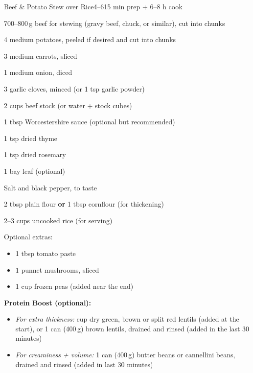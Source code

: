 \begin{recipebox}{Beef \& Potato Stew over Rice}{4--6}{15 min prep + 6--8 h cook}
  \begin{ingredients}
    \item 700--800\,g beef for stewing (gravy beef, chuck, or similar), cut into chunks
    \item 4 medium potatoes, peeled if desired and cut into chunks
    \item 3 medium carrots, sliced
    \item 1 medium onion, diced
    \item 3 garlic cloves, minced (or 1 tsp garlic powder)
    \item 2 cups beef stock (or water + stock cubes)
    \item 1 tbsp Worcestershire sauce (optional but recommended)
    \item 1 tsp dried thyme
    \item 1 tsp dried rosemary
    \item 1 bay leaf (optional)
    \item Salt and black pepper, to taste
    \item 2 tbsp plain flour \textbf{or} 1 tbsp cornflour (for thickening)
    \item 2--3 cups uncooked rice (for serving)
    \item Optional extras:
      \begin{itemize}
        \item 1 tbsp tomato paste
        \item 1 punnet mushrooms, sliced
        \item 1 cup frozen peas (added near the end)
      \end{itemize}
    \item \textbf{Protein Boost (optional):}
      \begin{itemize}
        \item \textit{For extra thickness:}  cup dry green, brown or split red lentils (added at the start), or 1 can (400\,g) brown lentils, drained and rinsed (added in the last 30 minutes)
        \item \textit{For creaminess + volume:} 1 can (400\,g) butter beans or cannellini beans, drained and rinsed (added in last 30 minutes)
      \end{itemize}
  \end{ingredients}


\end{recipebox}
